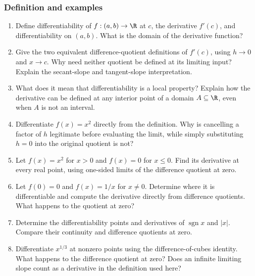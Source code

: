 \subsubsection*{Definition and examples}
\begin{enumerate}
  \item Define differentiability of \(f:(a,b)\to\R\) at \(c\),
    the derivative \(f'(c)\), and differentiability on \((a,b)\).
    What is the domain of the derivative function?

  \item Give the two equivalent difference-quotient definitions of
    \(f'(c)\), using \(h\to0\) and \(x\to c\).
    Why need neither quotient be defined at its limiting input?
    Explain the secant-slope and tangent-slope interpretation.

  \item What does it mean that differentiability is a local property?
    Explain how the derivative can be defined at any interior point
    of a domain \(A\subseteq\R\), even when \(A\) is not an interval.

  \item Differentiate \(f(x)=x^2\) directly from the definition.
    Why is cancelling a factor of \(h\) legitimate before evaluating
    the limit, while simply substituting \(h=0\) into the original
    quotient is not?

  \item Let \(f(x)=x^2\) for \(x>0\) and \(f(x)=0\) for
    \(x\leq0\). Find its derivative at every real point, using
    one-sided limits of the difference quotient at zero.

  \item Let \(f(0)=0\) and \(f(x)=1/x\) for \(x\ne0\).
    Determine where it is differentiable and compute the derivative
    directly from difference quotients. What happens to the quotient
    at zero?

  \item Determine the differentiability points and derivatives of
    \(\operatorname{sgn}x\) and \(|x|\). Compare their continuity
    and difference quotients at zero.

  \item Differentiate \(x^{1/3}\) at nonzero points using the
    difference-of-cubes identity. What happens to the difference
    quotient at zero? Does an infinite limiting slope count as a
    derivative in the definition used here?


\end{enumerate}
